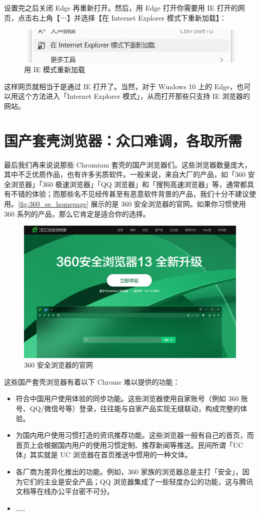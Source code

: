 设置完之后关闭 Edge 再重新打开。然后，用 Edge 打开你需要用 IE 打开的网页，点击右上角【⋯】并选择【在 Internet Explorer 模式下重新加载】：

\begin{figure}[htb!]
  \centering
  \includegraphics[width=.4\textwidth]{assets/software/Reload_in_IE_mode.png}
  \caption{用 IE 模式重新加载}
  \label{fig:Reload_in_IE_Mode}
\end{figure}

这样网页就相当于是通过 IE 打开了。当然，对于 Windows 10 上的 Edge，也可以用这个方法进入「Internet Explorer 模式」，从而打开那些只支持 IE 浏览器的网站。

\section{国产套壳浏览器：众口难调，各取所需}

最后我们再来说说那些 Chromium 套壳的国产浏览器们。这些浏览器数量庞大，其中不乏优质作品，也有许多劣质软件。一般来说，来自大厂的产品，如「360 安全浏览器」「360 极速浏览器」「QQ 浏览器」和「搜狗高速浏览器」等，通常都具有不错的体验；而那些名不见经传甚至有恶意软件背景的产品，我们十分不建议使用。\autoref{fig:360_se_homepage} 展示的是 360 安全浏览器的官网。如果你习惯使用 360 系列的产品，那么它肯定是适合你的选择。

\begin{figure}[htb!]
  \centering
  \includegraphics[width=.73\textwidth]{assets/software/360_se_homepage.png}
  \caption{360 安全浏览器的官网}
  \label{fig:360_se_homepage}
\end{figure}

这些国产套壳浏览器有着以下 Chrome 难以提供的功能：

\begin{itemize}
  \item 符合中国用户使用体验的同步功能。这些浏览器使用自家账号（例如 360 账号、QQ/微信号等）登录，往往能与自家产品实现无缝联动，构成完整的体验。
  \item 为国内用户使用习惯打造的资讯推荐功能。这些浏览器一般有自己的首页，而首页上会根据国内用户的使用习惯定制、推荐新闻等推送。民间所谓「UC 体」其实就是 UC 浏览器在首页推送中惯用的一种文体。
  \item 各厂商为差异化推出的功能。例如，360 家族的浏览器总是主打「安全」，因为它们的主业是安全产品；QQ 浏览器集成了一些轻度办公的功能，这与腾讯文档等在线办公平台密不可分。
  \item ……
\end{itemize}

